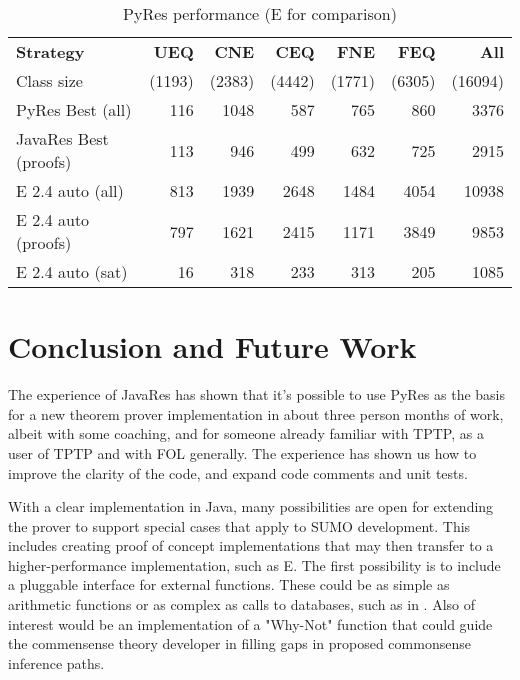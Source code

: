 \documentclass{llncs}
\begin{document}
\begin{table}[tbh]
  \begin{tabular}{lrrrrrr}
    \hline
    \textbf{Strategy} & \multicolumn{1}{p{4em}}{\hfill{}\textbf{UEQ}}
    & \multicolumn{1}{p{4em}}{\hfill{}\textbf{CNE}}& \multicolumn{1}{p{4em}}{\hfill{}\textbf{CEQ}}
    & \multicolumn{1}{p{4em}}{\hfill{}\textbf{FNE}}& \multicolumn{1}{p{4em}}{\hfill{}\textbf{FEQ}}
    & \multicolumn{1}{p{4em}}{\hfill{}\textbf{All}}\\
    {\tiny Class size}                            & {\tiny (1193)} & {\tiny (2383)} & {\tiny (4442)} & {\tiny (1771)} & {\tiny (6305)} & {\tiny (16094)}\\
    \hline
    PyRes Best (all)                                    &   116 &  1048 &   587 &   765 &   860 &  3376 \\
    JavaRes Best (proofs)                                 &   113 &   946 &   499 &   632 &   725 &  2915 \\
    \hline
    E 2.4 auto (all)                              &   813 &  1939 &  2648 &  1484 &  4054 & 10938 \\
    E 2.4 auto (proofs)                           &   797 &  1621 &  2415 &  1171 &  3849 &  9853 \\
    E 2.4 auto (sat)                              &    16 &   318 &   233 &   313 &   205 &  1085 \\
    \hline
  \end{tabular}
  \caption{PyRes performance (E for comparison)}
  \label{tab:res}
\end{table}

\section{Conclusion and Future Work}

The experience of JavaRes has shown that it's possible to use PyRes as the basis for a new theorem
prover implementation in about three person months of work, albeit with some coaching, and for
someone already familiar with TPTP, as a user of TPTP and with FOL generally.  The
experience has shown us how to improve the clarity of the code, and expand code comments and unit
tests.

With a clear implementation in Java, many possibilities are open for extending the prover to support
special cases that apply to SUMO development.  This includes creating proof of concept implementations
that may then transfer to a higher-performance implementation, such as E.  The first possibility is to
include a pluggable interface for external functions.  These could be as simple as arithmetic functions
or as complex as calls to databases, such as in \cite{DBLP:conf/ki/SudaSWLM09}.  Also of interest would be an implementation
of a "Why-Not" function \cite{10.5555/1650083.1650093} that could guide the commensense theory developer in filling gaps
in proposed commonsense inference paths.


\end{document}
